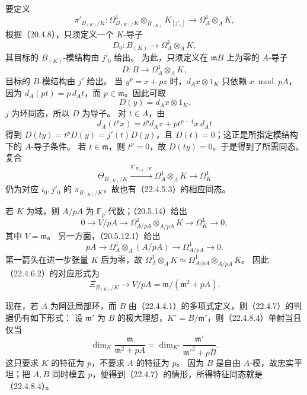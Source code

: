 要定义
\[
 \pi'_{B_{(K)}/K}:\Omega^1_{B_{(K)}/K}\otimes_{B_{(K)}}K_{[j'_0]}
 \longrightarrow\Omega^1_A\otimes_AK,
\]
根据（20.4.8），只须定义一个 $K$-导子
\begin{equation}
 D_0:B_{(K)}\longrightarrow\Omega^1_A\otimes_AK,
 \tag{22.4.8.2}
\end{equation}
其目标的 $B_{(K)}$-模结构由 $j'_0$ 给出。
为此，只须定义在 $\mathfrak mB$ 上为零的 $A$-导子
\begin{equation}
 D:B\longrightarrow\Omega^1_A\otimes_AK,
 \tag{22.4.8.3}
\end{equation}
目标的 $B$-模结构由 $j'$ 给出。
当 $y^p=x+pz$ 时，$d_Ax\otimes1_K$ 只依赖 $x\bmod pA$，因为
$d_A(pt)=p\,d_At$，而 $p\in\mathfrak m$。因此可取
\[
 D(y)=d_Ax\otimes1_K.
\]
$j$ 为环同态，所以 $D$ 为导子。
对 $t\in A$，由
\[
 d_A(t^px)=t^p d_Ax+pt^{p-1}x\,d_At
\]
得到 $D(ty)=t^pD(y)=j'(t)D(y)$，且 $D(t)=0$；这正是所指定模结构下的 $A$-导子条件。
若 $t\in\mathfrak m$，则 $t^p=0$，故 $D(ty)=0$。于是得到了所需同态。
复合
\[
 \Theta_{B_{(K)}/K}\xrightarrow{\pi'_{B_{(K)}/K}}\Omega^1_A\otimes_AK
 \longrightarrow\Omega^1_K
\]
仍为对应 $i_0,j'_0$ 的 $\pi_{B_{(K)}/K}$，故也有（22.4.5.3）的相应同态。

若 $K$ 为域，则 $A/pA$ 为 $\mathbb F_p$-代数；（20.5.14）给出
\[
 0\longrightarrow V/pA\longrightarrow
 \Omega^1_{A/pA}\otimes_{A/pA}K\longrightarrow\Omega^1_K\longrightarrow0,
\]
其中 $V=\mathfrak m$。
另一方面，（20.5.12.1）给出
\[
 pA\longrightarrow\Omega^1_A\otimes_A(A/pA)
 \longrightarrow\Omega^1_{A/pA}\longrightarrow0.
\]
第一箭头在进一步张量 $K$ 后为零，故
$\Omega^1_A\otimes_AK\simeq\Omega^1_{A/pA}\otimes_{A/pA}K$。
因此（22.4.6.2）的对应形式为
\begin{equation}
 \Xi_{B_{(K)}/K}\longrightarrow
 V/pA=\mathfrak m/(\mathfrak m^2+pA).
 \tag{22.4.8.4}
\end{equation}

现在，若 $A$ 为阿廷局部环，而 $B$ 由（22.4.4.1）的多项式定义，则（22.4.7）的判据仍有如下形式：
设 $\mathfrak m'$ 为 $B$ 的极大理想，$K'=B/\mathfrak m'$，则（22.4.8.4）单射当且仅当
\[
 \dim_K\frac{\mathfrak m}{\mathfrak m^2+pA}
 =\dim_{K'}\frac{\mathfrak m'}{\mathfrak m'^2+pB}.
\]
这只要求 $K$ 的特征为 $p$，不要求 $A$ 的特征为 $p$。
因为 $B$ 是自由 $A$-模，故忠实平坦；把 $A,B$ 同时模去 $p$，便得到（22.4.7）的情形，所得特征同态就是（22.4.8.4）。
